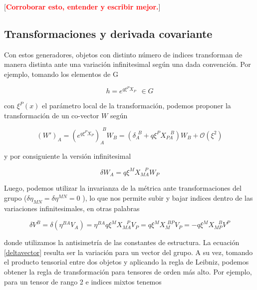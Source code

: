 \documentclass{article}
\numberwithin{equation}{section}
\begin{document}
[\textcolor{red}{\textbf{Corroborar esto, entender y escribir mejor.}}]\\

\subsection{Transformaciones y derivada covariante}

Con estos generadores, objetos con distinto número de indices transforman de manera distinta ante una variación infinitesimal según una dada convención. Por ejemplo, tomando los elementos de G

\begin{equation}
h= e^{q \xi^P X_P} \ \ \in G
\end{equation}

con $ \xi^P (x) $ el parámetro local de la transformación, podemos proponer la transformación de un co-vector $ W $ según

\begin{equation}
\left(W'\right)_A = \left(e^{q \xi^P X_P}\right)_A^{\ \ B} W_B = \left(\delta_A^{\ \ B} + q \xi^P X_{P A}^{\ \ \ \ B}\right) W_B + \mathcal{O}(\xi^2)
\end{equation}

y por consiguiente la versión infinitesimal

\begin{equation}\label{deltaforma}
\delta W_A = q \xi^M X_{M A}^{\ \ \ \ P} W_P
\end{equation}

Luego, podemos utilizar la invarianza de la métrica ante transformaciones del grupo ($ \delta \eta_{M N} = \delta \eta^{M N} =0$ ), lo que nos permite subir y bajar indices dentro de las variaciones infinitesimales, en otras palabras

\begin{equation}\label{deltavector}
\delta V^B = \delta \left( \eta^{B A} V_A  \right) = \eta^{B A} q \xi^M X_{M A}^{\ \ \ \ P} V_P = q \xi^M X_M^{\ \ B P} V_P = -q \xi^M X_{M P}^{\ \ \ \ B} V^P
\end{equation}

donde utilizamos la antisimetría de las constantes de estructura. La ecuación \ref{deltavector} resulta ser la variación para un vector del grupo. A su vez, tomando el producto tensorial entre dos objetos y aplicando la regla de Leibniz, podemos obtener la regla de transformación para tensores de orden más alto. Por ejemplo, para un tensor de rango 2 e indices mixtos tenemos
\end{document}

